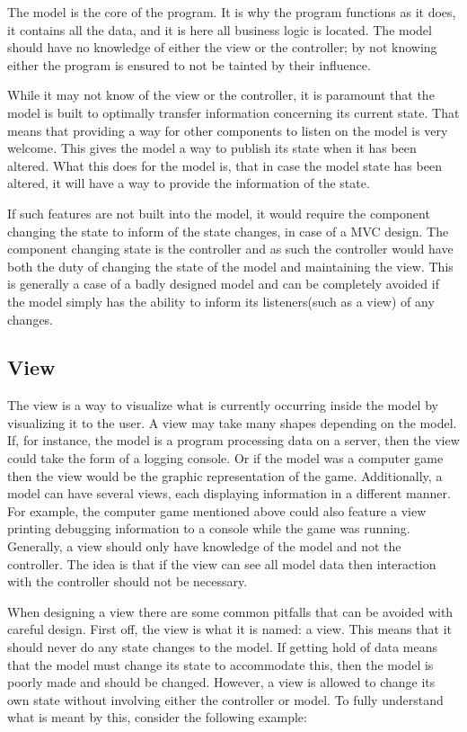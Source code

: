 The model is the core of the program. It is why the program functions
as it does, it contains all the data, and it is here all business
logic is located. The model should have no knowledge of either the
view or the controller; by not knowing either the program is ensured
to not be tainted by their influence.

While it may not know of the view or the controller, it is paramount
that the model is built to optimally transfer information concerning
its current state. That means that providing a way for other components
to listen on the model is very welcome\emph{. }This gives the model
a way to publish its state when it has been altered\emph{.} What this
does for the model is, that in case the model state has been altered,
it will have a way to provide the information of the state. 

If such features are not built into the model, it would require the
component changing the state to inform of the state changes, in case
of a MVC design. The component changing state is the controller and
as such the controller would have both the duty of changing the state
of the model and maintaining the view. This is generally a case of
a badly designed model and can be completely avoided if the model
simply has the ability to inform its listeners(such as a view) of
any changes.


\subsection{View}

The view is a way to visualize what is currently occurring inside
the model by visualizing it to the user. A view may take many shapes
depending on the model. If, for instance, the model is a program processing
data on a server, then the view could take the form of a logging console.
Or if the model was a computer game then the view would be the graphic
representation of the game. Additionally, a model can have several
views, each displaying information in a different manner. For example,
the computer game mentioned above could also feature a view printing
debugging information to a console while the game was running. Generally,
a view should only have knowledge of the model and not the controller.
The idea is that if the view can see all model data then interaction
with the controller should not be necessary.

When designing a view there are some common pitfalls that can be avoided
with careful design. First off, the view is what it is named: a view.
This means that it should never do any state changes to the model.
If getting hold of data means that the model must change its state
to accommodate this, then the model is poorly made and should be changed.
However, a view is allowed to change its own state without involving
either the controller or model. To fully understand what is meant
by this, consider the following example:

